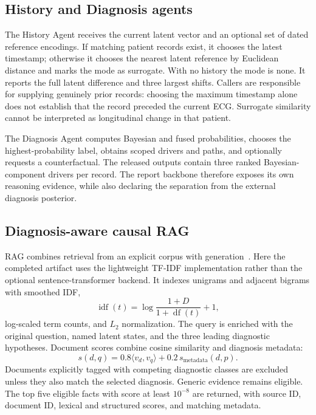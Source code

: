 \documentclass[11pt,a4paper]{article}
\begin{document}
\subsection{History and Diagnosis agents}
The History Agent receives the current latent vector and an optional set of dated reference encodings. If matching patient records exist, it chooses the latest timestamp; otherwise it chooses the nearest latent reference by Euclidean distance and marks the mode as surrogate. With no history the mode is none. It reports the full latent difference and three largest shifts. Callers are responsible for supplying genuinely prior records: choosing the maximum timestamp alone does not establish that the record preceded the current ECG. Surrogate similarity cannot be interpreted as longitudinal change in that patient.

The Diagnosis Agent computes Bayesian and fused probabilities, chooses the highest-probability label, obtains scoped drivers and paths, and optionally requests a counterfactual. The released outputs contain three ranked Bayesian-component drivers per record. The report backbone therefore exposes its own reasoning evidence, while also declaring the separation from the external diagnosis posterior.

\subsection{Diagnosis-aware causal RAG}
RAG combines retrieval from an explicit corpus with generation~\cite{rag}. Here the completed artifact uses the lightweight TF-IDF implementation rather than the optional sentence-transformer backend. It indexes unigrams and adjacent bigrams with smoothed IDF,
\begin{equation}
\operatorname{idf}(t)=\log\frac{1+D}{1+\operatorname{df}(t)}+1,
\end{equation}
log-scaled term counts, and $L_2$ normalization. The query is enriched with the original question, named latent states, and the three leading diagnostic hypotheses. Document scores combine cosine similarity and diagnosis metadata:
\begin{equation}
s(d,q)=0.8\langle v_d,v_q\rangle+0.2\,s_{\mathrm{metadata}}(d,p).
\end{equation}
Documents explicitly tagged with competing diagnostic classes are excluded unless they also match the selected diagnosis. Generic evidence remains eligible. The top five eligible facts with score at least $10^{-8}$ are returned, with source ID, document ID, lexical and structured scores, and matching metadata.
\end{document}
